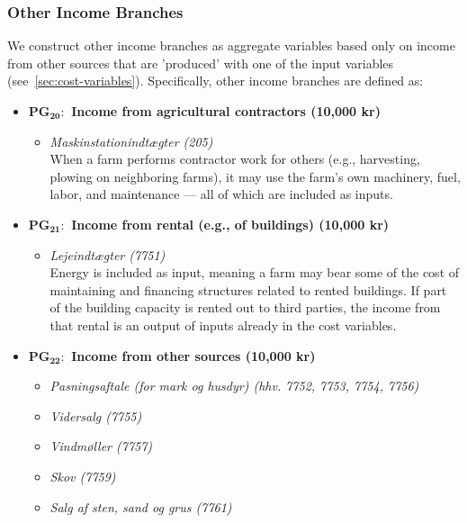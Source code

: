 \documentclass[12pt]{article}
\begin{document}
\subsubsection{Other Income Branches}
We construct other income branches as aggregate variables based only on income from other sources that are ’produced’ with one of the input variables (see~\ref{sec:cost-variables}). 
Specifically, other income branches are defined as:
\label{sec:other-income-sources}
\begin{itemize}
        \item \textbf{PG$_{\textbf{20}}:$ Income from agricultural contractors (10,000 kr)} 
        \begin{itemize}
            \item[$+$] \textit{Maskinstationindtægter (205)} \\[1ex]
            When a farm performs contractor work for others (e.g., harvesting, plowing on neighboring farms), it may use the farm’s own machinery, fuel, labor, and maintenance — all of which are included as inputs.
        \end{itemize}
        \item \textbf{PG$_{\textbf{21}}:$ Income from rental (e.g., of buildings) (10,000 kr)}
        \begin{itemize}
            \item[$+$] \textit{Lejeindtægter (7751)} \\[1ex]
            Energy is included as input, meaning a farm may bear some of the cost of maintaining and financing structures related to rented buildings. 
            If part of the building capacity is rented out to third parties, the income from that rental is an output of inputs already in the cost variables. 
        \end{itemize}
        \item \textbf{PG$_{\textbf{22}}:$ 
        Income from other sources (10,000 kr)}
        \begin{itemize}
            \item[$+$] \textit{Pasningsaftale (for mark og husdyr) (hhv. 7752, 7753, 7754, 7756)}
            \item[$+$] \textit{Vidersalg (7755)}
            \item[$+$] \textit{Vindmøller (7757)}
            \item[$+$] \textit{Skov (7759)}
            \item[$+$] \textit{Salg af sten, sand og grus (7761)}
        \end{itemize}
\end{itemize}
\end{document}
